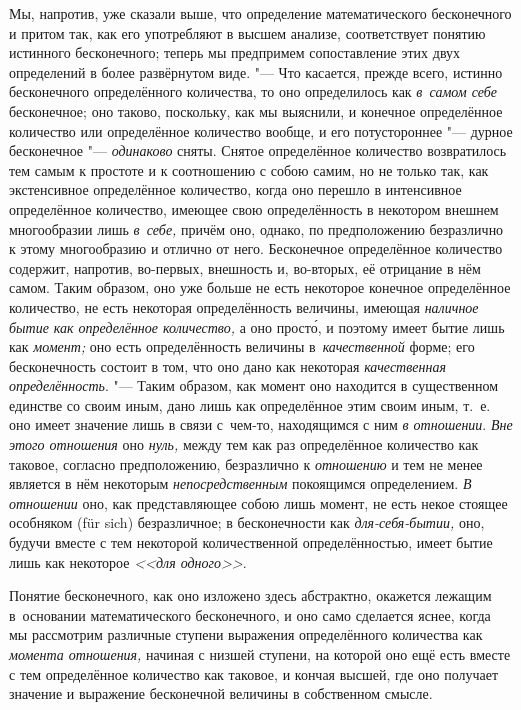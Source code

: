 Мы, напротив, уже сказали выше, что определение математического бесконечного и
притом так, как его употребляют в высшем анализе, соответствует понятию
истинного бесконечного; теперь мы предпримем сопоставление этих двух
определений в более развёрнутом виде. "--- Что касается, прежде всего, истинно
бесконечного определённого количества, то оно определилось как {\em в~самом
себе} бесконечное; оно таково, поскольку, как мы выяснили, и конечное
определённое количество или определённое количество вообще, и его потустороннее
"--- дурное бесконечное "--- {\em одинаково} сняты. Снятое определённое количество
возвратилось тем самым к простоте и к соотношению с собою самим, но не только
так, как экстенсивное определённое количество, когда оно перешло в интенсивное
определённое количество, имеющее свою определённость в некотором внешнем
многообразии лишь {\em в~себе,} причём оно, однако, по предположению
безразлично к этому многообразию и отлично от него. Бесконечное определённое
количество содержит, напротив, во-первых, внешность и, во-вторых, её отрицание
в нём самом. Таким образом, оно уже больше не есть некоторое конечное
определённое количество, не есть некоторая определённость величины, имеющая
{\em наличное бытие как определённое количество,} а оно прост\'{о}, и поэтому имеет
бытие лишь как {\em момент;} оно есть определённость величины
в~{\em качественной} форме; его бесконечность состоит в том, что оно дано как
некоторая {\em качественная определённость}. "--- Таким образом, как момент оно
находится в существенном единстве со своим иным, дано лишь как
определённое этим своим иным, т.~е. оно имеет значение лишь в связи
с~чем-то, находящимся с ним {\em в отношении}. {\em Вне этого отношения} оно
{\em нуль,} между тем как раз определённое количество как таковое, согласно
предположению, безразлично к {\em отношению} и тем не менее является в нём
некоторым {\em непосредственным} покоящимся определением. {\em В отношении}
оно, как представляющее собою лишь момент, не есть некое стоящее особняком
(für sich) безразличное; в бесконечности как {\em для-себя-бытии,} оно, будучи
вместе с тем некоторой количественной определённостью, имеет бытие лишь как
некоторое {\em <<для одного>>}.

Понятие бесконечного, как оно изложено здесь абстрактно, окажется лежащим
в~основании математического бесконечного, и оно само сделается яснее, когда
мы рассмотрим различные ступени выражения определённого количества как
{\em момента отношения,} начиная с низшей ступени, на которой оно ещё есть
вместе с тем определённое количество как таковое, и кончая высшей, где оно
получает значение и выражение бесконечной величины в собственном смысле.

